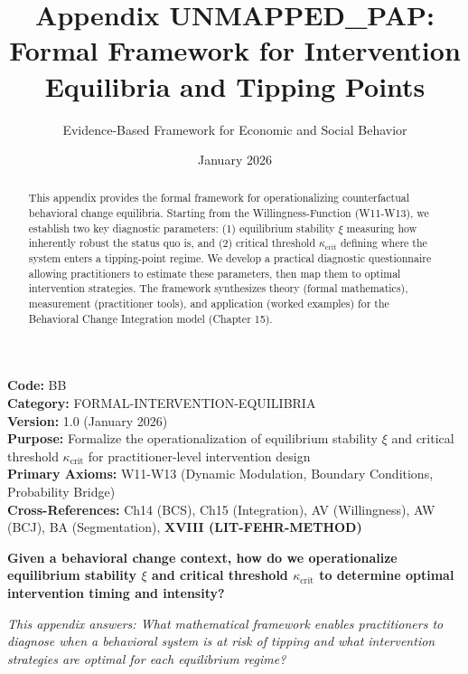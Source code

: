 \documentclass[11pt, a4paper]{article}
\title{Appendix UNMAPPED_PAP: Formal Framework for Intervention Equilibria and Tipping Points}
\author{Evidence-Based Framework for Economic and Social Behavior}
\date{January 2026}
\begin{document}
\maketitle


\begin{tcolorbox}[colback=gray!10!white, colframe=gray!75!black, title=Appendix Metadata]
\textbf{Code:} BB \\
\textbf{Category:} FORMAL-INTERVENTION-EQUILIBRIA \\
\textbf{Version:} 1.0 (January 2026) \\
\textbf{Purpose:} Formalize the operationalization of equilibrium stability $\xi$ and critical threshold $\kappa_{\text{crit}}$
for practitioner-level intervention design \\
\textbf{Primary Axioms:} W11-W13 (Dynamic Modulation, Boundary Conditions, Probability Bridge) \\
\textbf{Cross-References:} Ch14 (BCS), Ch15 (Integration), AV (Willingness),
AW (BCJ), BA (Segmentation), \textbf{XVIII (LIT-FEHR-METHOD)} \\
\end{tcolorbox}

\begin{abstract}
This appendix provides the formal framework for operationalizing counterfactual behavioral change equilibria.
Starting from the Willingness-Function (W11-W13), we establish two key diagnostic parameters:
(1) equilibrium stability $\xi$ measuring how inherently robust the status quo is, and
(2) critical threshold $\kappa_{\text{crit}}$ defining where the system enters a tipping-point regime.
We develop a practical diagnostic questionnaire allowing practitioners to estimate these parameters,
then map them to optimal intervention strategies. The framework synthesizes theory (formal mathematics),
measurement (practitioner tools), and application (worked examples) for the Behavioral Change Integration model (Chapter 15).
\end{abstract}


\begin{tcolorbox}[colback=blue!5!white, colframe=blue!75!black,
    title=\textbf{Fundamental Question}]
\textbf{Given a behavioral change context, how do we operationalize equilibrium stability $\xi$
and critical threshold $\kappa_{\text{crit}}$ to determine optimal intervention timing and intensity?}

\medskip
\textit{This appendix answers: What mathematical framework enables practitioners to diagnose
when a behavioral system is at risk of tipping and what intervention strategies are optimal
for each equilibrium regime?}
\end{tcolorbox}
\end{document}

